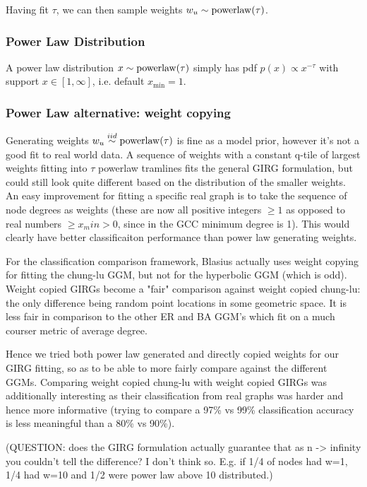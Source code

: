 Having fit $\tau$, we can then sample weights $w_u \sim \operatorname{powerlaw}(\tau)$.

\subsubsection{Power Law Distribution}
A power law distribution $x \sim \operatorname{powerlaw}(\tau)$ simply has pdf $p(x) \propto x^{-\tau}$ with support $x \in [1, \infty]$, i.e. default $x_{\min} = 1$.

\subsubsection{Power Law alternative: weight copying}
Generating weights $w_u \stackrel{iid}{\sim} \operatorname{powerlaw}(\tau)$ is fine as a model prior, however it's not a good fit to real world data. A sequence of weights with a constant q-tile of largest weights fitting into $\tau$ powerlaw tramlines fits the general GIRG formulation, but could still look quite different based on the distribution of the smaller weights. An easy improvement for fitting a specific real graph is to take the sequence of node degrees as weights (these are now all positive integers $\geq 1$ as opposed to real numbers $\geq x_min > 0$, since in the GCC minimum degree is 1). This would clearly have better classificaiton performance than power law generating weights.

For the classification comparison framework, Blasius actually uses weight copying for fitting the chung-lu GGM, but not for the hyperbolic GGM (which is odd). Weight copied GIRGs become a "fair" comparison against weight copied chung-lu: the only difference being random point locations in some geometric space. It is less fair in comparison to the other ER and BA GGM's which fit on a much courser metric of average degree.

Hence we tried both power law generated and directly copied weights for our GIRG fitting, so as to be able to more fairly compare against the different GGMs. Comparing weight copied chung-lu with weight copied GIRGs was additionally interesting as their classification from real graphs was harder and hence more informative (trying to compare a 97\% vs 99\% classification accuracy is less meaningful than a 80\% vs 90\%).

(QUESTION: does the GIRG formulation actually guarantee that as n -> infinity you couldn't tell the difference? I don't think so. E.g. if 1/4 of nodes had w=1, 1/4 had w=10 and 1/2 were power law above 10 distributed.)


